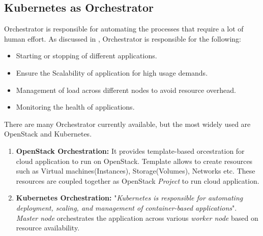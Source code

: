 \subsection{Kubernetes as Orchestrator}
\label{sec:k8s_orchestrator}
Orchestrator is responsible for automating the processes that require a lot of human effort. As discussed in \cite{containerjournal}, Orchestrator is responsible for the following:
\begin{itemize}
  \item Starting or stopping of different applications.
  \item Ensure the Scalability of application for high usage demands.
  \item Management of load across different nodes to avoid resource overhead.
  \item Monitoring the health of applications.
\end{itemize}
There are many Orchestrator currently available, but the most widely used are OpenStack and Kubernetes.
\begin{enumerate}
  \item \textbf{OpenStack Orchestration:} It provides template-based orcestration for cloud application to run on OpenStack. Template allows to create resources such as Virtual machines(Instances), Storage(Volumes), Networks etc. These resources are coupled together as OpenStack \emph{Project} to run cloud application\cite{openstackOrchestrator}.
  \item \textbf{Kubernetes Orchestration:} "\emph{Kubernetes is responsible for automating deployment, scaling, and management of container-based applications}". \emph{Master node} orchestrates the application across various \emph{worker node} based on resource availability\cite{k8s}.
\end{enumerate}
